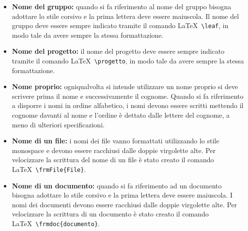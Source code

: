 \documentclass[../NormeProgetto.tex]{subfiles}
\begin{document}
				\begin{itemize}
					\item \textbf{Nome del gruppo:} quando si fa riferimento al nome del gruppo bisogna adottare lo stile corsivo e la prima lettera deve essere maiuscola.	
				Il nome del gruppo deve essere sempre indicato tramite il comando \LaTeX\ \texttt{\textbackslash leaf}, in modo tale da avere sempre la stessa formattazione.
				\item \textbf{Nome del progetto:} il nome del progetto deve essere sempre indicato tramite il comando \LaTeX\ \texttt{\textbackslash progetto}, in modo tale da avere sempre la stessa formattazione.
				\item \textbf{Nome proprio:} ogniqualvolta si intende utilizzare un nome proprio si deve scrivere prima il nome e successivamente il cognome. Quando si fa riferimento a disporre i nomi in ordine alfabetico, i nomi devono essere scritti mettendo il cognome davanti al nome e l'ordine è dettato dalle lettere del cognome, a meno di ulteriori specificazioni.				
				\item \textbf{Nome di un file:} i nomi dei file vanno formattati utilizzando lo stile monospace e devono essere racchiusi dalle doppie virgolette alte.  Per velocizzare la scrittura del nome di un file è stato creato il comando \LaTeX\ \texttt{\textbackslash frmFile\{File\}}.				
				\item \textbf{Nome di un documento:} quando si fa riferimento ad un documento bisogna adottare lo stile corsivo e la prima lettera deve essere maiuscola. I  nomi dei documenti devono essere racchiusi dalle doppie virgolette alte. Per velocizzare la scrittura di un documento è stato creato il comando \LaTeX\ \texttt{\textbackslash frmdoc\{documento\}}.				
				\end{itemize}
\end{document}
